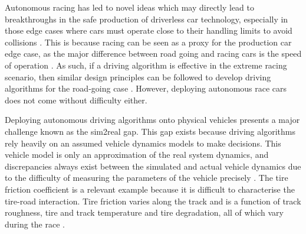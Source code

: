 Autonomous racing has led to novel ideas which may directly lead to breakthroughs in the safe production of driverless car technology, especially in those edge cases where cars must operate close to their handling limits to avoid collisions \cite{Weiss2020a}.
This is because racing can be seen as a proxy for the production car edge case, as the major difference between road going and racing cars is the speed of operation \cite{Wadekar2021}.
As such, if a driving algorithm is effective in the extreme racing scenario, then similar design principles can be followed to develop driving algorithms for the road-going case \cite{Weiss2020a}.
However, deploying autonomous race cars does not come without difficulty either.




Deploying autonomous driving algorithms onto physical vehicles presents a major challenge known as the sim2real gap.
This gap exists because driving algorithms rely heavily on an assumed vehicle dynamics models to make decisions.
This vehicle model is only an approximation of the real system dynamics, and discrepancies always exist between the simulated and actual vehicle dynamics due to the difficulty of measuring the parameters of the vehicle precisely \cite{Hewing2018}. 
The tire friction coefficient is a relevant example because it is difficult to characterise the tire-road interaction.
Tire friction varies along the track and is a function of track roughness, tire and track temperature and tire degradation, all of which vary during the race \cite{Sharp2016}.

